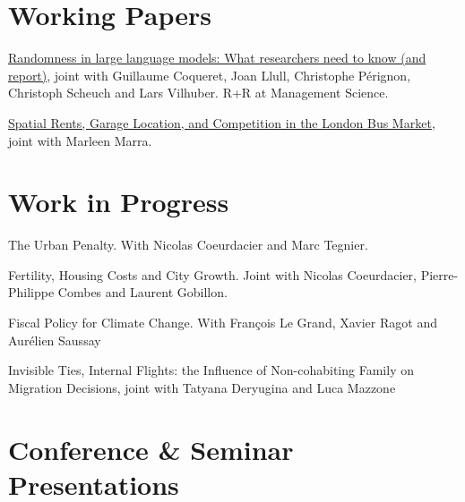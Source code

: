 \documentclass[letterpaper]{article}
\renewenvironment{itemize}{
  \begin{list}{}{
    \setlength{\leftmargin}{1.5em}
  }
}{
  \end{list}
}
\begin{document}
\section*{Working Papers}

\begin{itemize}

\item \href{https://floswald.github.io/publication/llm-randomness/}{Randomness in large language models: What researchers need to know (and report)}, joint with Guillaume Coqueret, Joan Llull, Christophe Pérignon, Christoph Scheuch and Lars Vilhuber. R+R at Management Science.
\item \href{https://floswald.github.io/publication/garage-locations/}{Spatial Rents, Garage Location, and Competition in the London Bus Market}, joint with Marleen Marra.
\end{itemize}

\section*{Work in Progress}

\begin{itemize}
\item The Urban Penalty. With Nicolas Coeurdacier and Marc Tegnier.
\item Fertility, Housing Costs and City Growth. Joint with Nicolas Coeurdacier, Pierre-Philippe Combes and Laurent Gobillon.
\item Fiscal Policy for Climate Change. With François Le Grand, Xavier Ragot and Aurélien Saussay
\item Invisible Ties, Internal Flights: the Influence of Non-cohabiting Family on Migration Decisions, joint with Tatyana Deryugina and Luca Mazzone
\end{itemize}

\section*{Conference \& Seminar Presentations}
\end{document}
